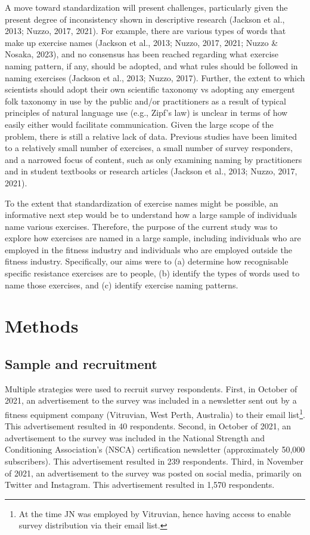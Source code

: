 \documentclass[
]{article}
\begin{document}
A move toward standardization will present challenges, particularly
given the present degree of inconsistency shown in descriptive research
(Jackson et al., 2013; Nuzzo, 2017, 2021). For example, there are
various types of words that make up exercise names (Jackson et al.,
2013; Nuzzo, 2017, 2021; Nuzzo \& Nosaka, 2023), and no consensus has
been reached regarding what exercise naming pattern, if any, should be
adopted, and what rules should be followed in naming exercises (Jackson
et al., 2013; Nuzzo, 2017). Further, the extent to which scientists
should adopt their own scientific taxonomy vs adopting any emergent folk
taxonomy in use by the public and/or practitioners as a result of
typical principles of natural language use (e.g., Zipf's law) is unclear
in terms of how easily either would facilitate communication. Given the
large scope of the problem, there is still a relative lack of data.
Previous studies have been limited to a relatively small number of
exercises, a small number of survey responders, and a narrowed focus of
content, such as only examining naming by practitioners and in student
textbooks or research articles (Jackson et al., 2013; Nuzzo, 2017,
2021).

To the extent that standardization of exercise names might be possible,
an informative next step would be to understand how a large sample of
individuals name various exercises. Therefore, the purpose of the
current study was to explore how exercises are named in a large sample,
including individuals who are employed in the fitness industry and
individuals who are employed outside the fitness industry. Specifically,
our aims were to (a) determine how recognisable specific resistance
exercises are to people, (b) identify the types of words used to name
those exercises, and (c) identify exercise naming patterns.

\section{Methods}\label{methods}

\subsection{Sample and recruitment}\label{sample-and-recruitment}

Multiple strategies were used to recruit survey respondents. First, in
October of 2021, an advertisement to the survey was included in a
newsletter sent out by a fitness equipment company (Vitruvian, West
Perth, Australia) to their email list\footnote{At the time JN was
  employed by Vitruvian, hence having access to enable survey
  distribution via their email list.}. This advertisement resulted in 40
respondents. Second, in October of 2021, an advertisement to the survey
was included in the National Strength and Conditioning Association's
(NSCA) certification newsletter (approximately 50,000 subscribers). This
advertisement resulted in 239 respondents. Third, in November of 2021,
an advertisement to the survey was posted on social media, primarily on
Twitter and Instagram. This advertisement resulted in 1,570 respondents.
\end{document}
